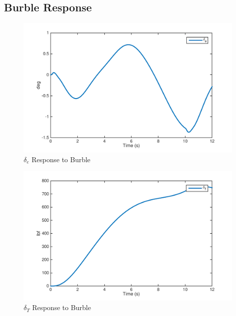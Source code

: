 \documentclass[12pt]{article}
\begin{document}
\subsection{Burble Response}
\begin{figure}[h!]
\begin{center}
\includegraphics[height=.39\textheight]{figures/1_de}
\caption{$\delta_e$ Response to Burble}
\end{center}
\end{figure}

\begin{figure}[h!]
\begin{center}
\includegraphics[height=.4\textheight]{figures/1_dt}
\caption{$\delta_T$ Response to Burble}
\end{center}
\end{figure}
\end{document}
